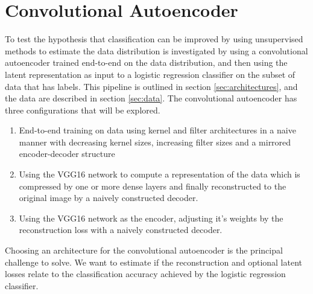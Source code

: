 \section{Convolutional Autoencoder}

To test the hypothesis that classification can be improved by using unsupervised methods to estimate the data distribution is investigated by using a convolutional autoencoder trained end-to-end on the data distribution, and then using the latent representation as input to a logistic regression classifier on the subset of data that has labels. This pipeline is outlined in section \ref{sec:architectures}, and the data are described in section \ref{sec:data}. The convolutional autoencoder has three configurations that will be explored. 
\begin{enumerate}
	\item End-to-end training on data using kernel and filter architectures in a naive manner with decreasing kernel sizes, increasing filter sizes and a mirrored encoder-decoder structure
	\item Using the VGG16 network to compute a representation of the data which is compressed by one or more dense layers and finally reconstructed to the original image by a naively constructed decoder. 
	\item  Using the VGG16 network as the encoder, adjusting it's weights by the reconstruction loss with a naively constructed decoder. 
\end{enumerate}

Choosing an architecture for the convolutional autoencoder is the principal challenge to solve. We want to estimate if the reconstruction and optional latent losses relate to the classification accuracy achieved by the logistic regression classifier. 

